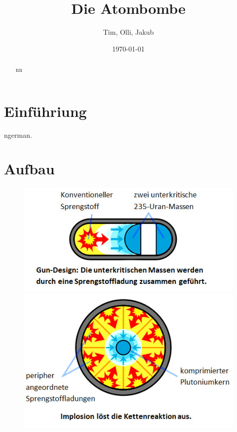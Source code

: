\documentclass[a4paper,12pt]{article}
\title{Die Atombombe}
\author{Tim, Olli, Jakub}
\date{\today}
\begin{document}
\pagestyle{fancy}

\fancyfoot[LE,RO]{\thepage}

\maketitle

\begin{abstract}
nn
\end{abstract}

\newpage

\tableofcontents

\newpage

\section{Einführiung}
ngerman\cite{ngerman}.

\section{Aufbau}
\begin{figure}
    \vspace{-1.4cm}
    \centering
    \includegraphics[scale=0.7]{Gun.png}
    \includegraphics[scale=0.7]{Implosion.png}
\end{figure}
\end{document}
